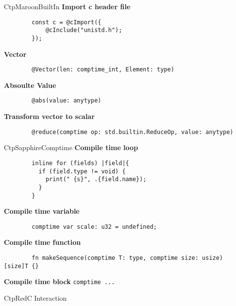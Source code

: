 \documentclass[10pt,a4paper]{article}
\begin{document}
\begin{multicols*}{3}
\begin{mycolorbox}{CtpMaroon}{BuiltIn}
	\textbf{Import c header file}
	\begin{verbatim}
		const c = @cImport({
			@cInclude("unistd.h");
		});
	\end{verbatim}
	
	\textbf{Vector}
	\begin{verbatim}
		@Vector(len: comptime_int, Element: type)
	\end{verbatim}
	
	\textbf{Absoulte Value}
	\begin{verbatim}
		@abs(value: anytype)
	\end{verbatim}
	
	\textbf{Transform vector to scalar}
	\begin{verbatim}
		@reduce(comptime op: std.builtin.ReduceOp, value: anytype)
	\end{verbatim}
	
\end{mycolorbox}


\begin{mycolorbox}{CtpSapphire}{Comptime}
		\textbf{Compile time loop}
	\begin{verbatim}
		inline for (fields) |field|{
		  if (field.type != void) {
		    print(" {s}", .{field.name});
		  }
		}
	\end{verbatim}

		\textbf{Compile time variable}
	\begin{verbatim}
		comptime var scale: u32 = undefined;
	\end{verbatim}

		\textbf{Compile time function}
	\begin{verbatim}
		fn makeSequence(comptime T: type, comptime size: usize) [size]T {}
	\end{verbatim}

		\textbf{Compile time block}	\texttt{comptime {...}}\\

\end{mycolorbox}

\begin{mycolorbox}{CtpRed}{C Interaction}
\end{mycolorbox}


\end{multicols*}
\end{document}
